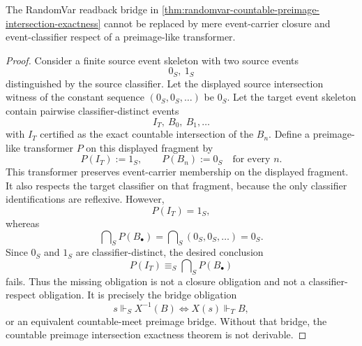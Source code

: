 \begin{proposition}
\label{prop:randomvar-countable-preimage-intersection-readback-obstruction}
The RandomVar readback bridge in \autoref{thm:randomvar-countable-preimage-intersection-exactness} cannot be replaced by mere event-carrier
closure and event-classifier respect of a preimage-like transformer.
\end{proposition}
\begin{proof}
Consider a finite source event skeleton with two source events
$$
0_S,\ 1_S
$$
distinguished by the source classifier. Let the displayed source intersection witness of the constant sequence
$(0_S,0_S,\ldots)$ be $0_S$.
Let the target event skeleton contain pairwise classifier-distinct events
$$
I_T,\ B_0,\ B_1,\ldots
$$
with $I_T$ certified as the exact countable intersection of the $B_n$. Define a preimage-like
transformer $P$ on this displayed fragment by
$$
P(I_T):=1_S,\qquad P(B_n):=0_S\quad\text{for every }n.
$$
This transformer preserves event-carrier membership on the displayed fragment. It also respects
the target classifier on that fragment, because the only classifier identifications are reflexive.
However,
$$
P(I_T)=1_S,
$$
whereas
$$
\bigcap\nolimits_S P(B_\bullet)
=
\bigcap\nolimits_S (0_S,0_S,\ldots)
=
0_S.
$$
Since $0_S$ and $1_S$ are classifier-distinct, the desired conclusion
$$
P(I_T)\equiv_S\bigcap\nolimits_S P(B_\bullet)
$$
fails.
Thus the missing obligation is not a closure obligation and not a classifier-respect obligation. It is precisely the bridge obligation
$$
s\Vdash_S X^{-1}(B)\Longleftrightarrow X(s)\Vdash_T B,
$$
or an equivalent countable-meet preimage bridge. Without that bridge, the countable preimage
intersection exactness theorem is not derivable.
\end{proof}
